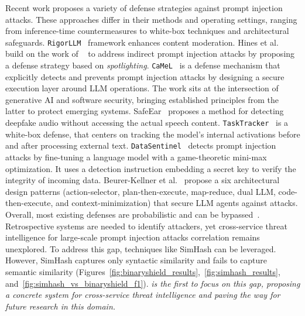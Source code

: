 Recent work proposes a variety of defense strategies against prompt injection attacks. These approaches differ in their methods and operating settings, ranging from inference-time countermeasures to white-box techniques and architectural safeguards.
\texttt{RigorLLM}~\cite{yuan2024rigorllm} framework enhances content moderation. Hines et al.~\cite{Hines2024Defending} build on the work of ~\cite{yi2025benchmarking}
to address indirect prompt injection attacks by proposing a defense strategy based on \emph{spotlighting}.
\texttt{CaMeL}~\cite{Debenedetti2025defeating} is a defense mechanism that explicitly detects and prevents prompt injection attacks by designing a secure execution layer around LLM operations.
The work sits at the intersection of generative AI and software security, bringing established principles from the latter to protect emerging systems.
SafeEar~\cite{SafeEar} proposes a method for detecting deepfake audio without accessing the actual speech content.
\texttt{TaskTracker}~\cite{abdelnabi2025get} is a white-box defense,  that centers on tracking the model’s internal activations before and after processing external text. 
\texttt{DataSentinel}~\cite{liu2025datasentinel} detects prompt injection attacks by fine-tuning a language model with a game-theoretic mini-max optimization. It uses a detection instruction embedding a secret key to verify the integrity of incoming data.
Beurer-Kellner et al.~\cite{beurerkellner2025design} propose a six architectural design patterns (action-selector, plan-then-execute, map-reduce, dual LLM, code-then-execute, and context-minimization) that secure LLM agents against attacks. 
Overall, most existing defenses are probabilistic and can be bypassed~\cite{Debenedetti2025defeating, costa2025securingaiagentsinformationflow}. Retrospective systems are needed to identify attackers, yet cross-service threat intelligence for large-scale prompt injection attacks correlation remains unexplored. To address this gap, techniques like SimHash can be leveraged. However, SimHash captures only syntactic similarity and fails to capture semantic similarity (Figures~\ref{fig:binaryshield_results},~\ref{fig:simhash_results}, and~\ref{fig:simhash_vs_binaryshield_f1}). 
\emph{\tool is the first to focus on this gap, proposing a concrete system for cross-service threat intelligence and paving the way for future research in this domain.}








